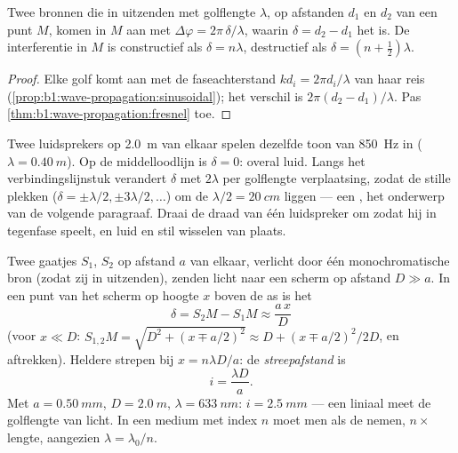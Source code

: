 \begin{proposition}\label{prop:b1:wave-propagation:pathdiff}
Twee bronnen die in  uitzenden met golflengte $\lambda$, op afstanden
$d_1$ en $d_2$ van een punt $M$, komen in $M$ aan met
$\Delta\varphi = 2\pi\,\delta/\lambda$, waarin $\delta = d_2 - d_1$ het
\emph{} is. De interferentie in $M$ is constructief als
$\delta = n\lambda$, destructief als $\delta = (n + \tfrac12)\lambda$.
\end{proposition}

\begin{proof}
Elke golf komt aan met de faseachterstand $kd_i = 2\pi d_i/\lambda$ van haar
reis (\cref{prop:b1:wave-propagation:sinusoidal}); het verschil is
$2\pi(d_2 - d_1)/\lambda$. Pas \cref{thm:b1:wave-propagation:fresnel} toe.
\end{proof}

\begin{example}\label{ex:b1:wave-propagation:speakers}
Twee luidsprekers op \qty{2.0}{m} van elkaar spelen dezelfde toon van
\qty{850}{Hz} in  ($\lambda = \qty{0.40}{m}$). Op de middelloodlijn is
$\delta = 0$: overal luid. Langs het verbindingslijnstuk verandert $\delta$
met $2\lambda$ per golflengte verplaatsing, zodat de stille plekken
($\delta = \pm\lambda/2, \pm 3\lambda/2, \dots$) om de
$\lambda/2 = \qty{20}{cm}$ liggen --- een , het onderwerp van de
volgende paragraaf. Draai de draad van één luidspreker om zodat hij in
tegenfase speelt, en luid en stil wisselen van plaats.
\end{example}

\begin{example}\label{ex:b1:wave-propagation:young}
Twee gaatjes $S_1$, $S_2$ op afstand $a$ van elkaar, verlicht door één
monochromatische bron (zodat zij in  uitzenden), zenden licht naar een
scherm op afstand $D \gg a$. In een punt van het scherm op hoogte $x$
boven de as is het 
\[
\delta = S_2M - S_1M \approx \frac{a\,x}{D}
\]
(voor $x \ll D$: $S_{1,2}M = \sqrt{D^2 + (x \mp a/2)^2} \approx D +
(x \mp a/2)^2/2D$, en aftrekken). Heldere strepen bij $x = n\lambda D/a$:
de \emph{streepafstand} is
\[
i = \frac{\lambda D}{a} .
\]
Met $a = \qty{0.50}{mm}$, $D = \qty{2.0}{m}$, $\lambda = \qty{633}{nm}$:
$i = \qty{2.5}{mm}$ --- een liniaal meet de golflengte van licht. In een
medium met index $n$ moet men als  de \emph{}
nemen, $n \times$ lengte, aangezien $\lambda = \lambda_0/n$.
\end{example}

